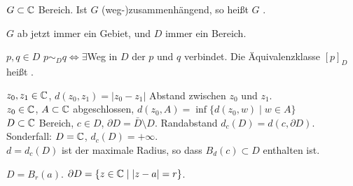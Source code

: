 \begin{definition}
	$ G\subset\mathbb{C} $ Bereich. Ist $ G $ (weg-)zusammenh\"angend, so hei\ss t $ G $ .
\end{definition}
$ G $ ab jetzt immer ein Gebiet, und $ D $ immer ein Bereich.\\
\begin{definition}
	$ p,q\in D $ $ p\sim_D q \Leftrightarrow\exists$Weg in $ D $ der $ p $ und $ q $ verbindet. Die \"Aquivalenzklasse $ [p]_D $ hei\ss t .
\end{definition}
$ z_0,z_1\in\mathbb{C} $, $ d(z_0,z_1)=|z_0-z_1| $ Abstand zwischen $ z_0 $ und $ z_1 $.\\
$ z_0\in\mathbb{C} $, $ A\subset\mathbb{C} $ abgeschlossen, $ d(z_0,A)=\inf\lbrace d(z_0,w)\mid w\in A\rbrace $\\
$ D\subset\mathbb{C} $ Bereich, $ c\in D $, $ \partial D=\bar D\setminus D $. Randabstand $ d_c(D)=d(c,\partial D) $.\\
Sonderfall: $ D=\mathbb{C} $, $ d_c(D)=+\infty $.\\
$ d=d_c(D) $ ist der maximale Radius, so dass $ B_d(c)\subset D $ enthalten ist.
\begin{beispiel*}
	$ D=B_r(a) $. $ \partial D=\lbrace z\in\mathbb{C}\mid |z-a|=r\rbrace $.
\end{beispiel*}
